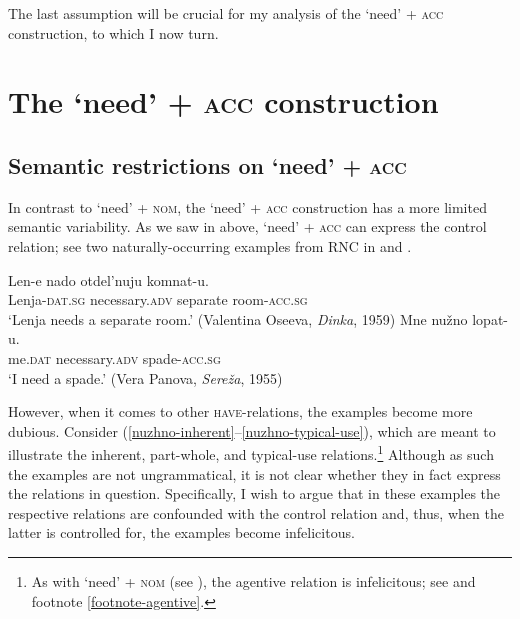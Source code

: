 \documentclass[output=paper]{langscibook}
\begin{document}
The last assumption will be crucial for my analysis of the `need' + \textsc{acc} construction, to which I now turn.

\section{The `need' + \textsc{acc} construction}\label{section-acc}

\subsection{Semantic restrictions on `need' + \textsc{acc}}\label{section-acc-restrictions}

In contrast to `need' + \textsc{nom}, the `need' + \textsc{acc} construction has a more limited semantic variability. As we saw in  above, `need' + \textsc{acc} can express the control relation; see two naturally-occurring examples from RNC in  and .

    \largerpage[-1] %

\ea
\ea\label{nuzhno-control-corpus-1}
\gll Len-e nado otdel'nuju komnat-u.\\
Lenja-\textsc{dat.sg} necessary.\textsc{adv} separate room-\textsc{acc.sg}\\
\glt `Lenja needs a separate room.’ \hfill (Valentina Oseeva, \textit{Dinka}, 1959)
\ex \label{nuzhno-control-corpus-2}
\gll Mne nužno lopat-u.\\
me.\textsc{dat} necessary.\textsc{adv} spade-\textsc{acc.sg}\\
\glt ‘I need a spade.’ \hfill (Vera Panova, \textit{Sereža}, 1955)
\z\z

\noindent However, when it comes to other \textsc{have}-relations, the examples become more dubious. Consider (\ref{nuzhno-inherent}--\ref{nuzhno-typical-use}), which are meant to illustrate the inherent, part-whole, and typical-use relations.\footnote{As with `need' + \textsc{nom} (see ), the agentive relation is infelicitous; see  and footnote \ref{footnote-agentive}.

\z
} Although as such the examples are not ungrammatical, it is not clear whether they in fact express the relations in question. Specifically, I wish to argue that in these examples the respective relations are confounded with the control relation and, thus, when the latter is controlled for, the examples become infelicitous.
\end{document}
